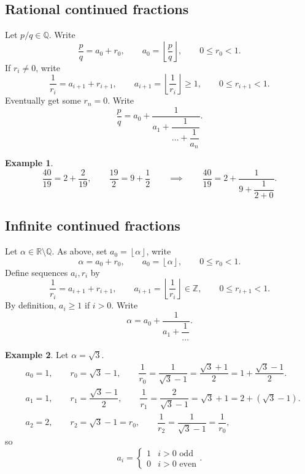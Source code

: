 \documentclass{article}
\newcommand{\Z}{\mathbb{Z}}
\newcommand{\Q}{\mathbb{Q}}
\newcommand{\R}{\mathbb{R}}
\newcommand{\rb}[1]{\left( #1 \right)}
\newcommand{\fb}[1]{\left\lfloor #1 \right\rfloor}
\theoremstyle{definition}\newtheorem{definition}{Definition}
\theoremstyle{definition}\newtheorem{remark}[definition]{Remark}
\theoremstyle{definition}\newtheorem*{example}{Example}
\theoremstyle{definition}\newtheorem*{note}{Note}
\begin{document}
\subsection{Rational continued fractions}

Let $ p / q \in \Q $. Write
$$ \dfrac{p}{q} = a_0 + r_0, \qquad a_0 = \fb{\dfrac{p}{q}}, \qquad 0 \le r_0 < 1. $$
If $ r_i \ne 0 $, write
$$ \dfrac{1}{r_i} = a_{i + 1} + r_{i + 1}, \qquad a_{i + 1} = \fb{\dfrac{1}{r_i}} \ge 1, \qquad 0 \le r_{i + 1} < 1. $$
Eventually get some $ r_n = 0 $. Write
$$ \dfrac{p}{q} = a_0 + \dfrac{1}{a_1 + \dfrac{1}{\dots + \dfrac{1}{a_n}}}. $$

\begin{example}
$$ \dfrac{40}{19} = 2 + \dfrac{2}{19}, \qquad \dfrac{19}{2} = 9 + \dfrac{1}{2} \qquad \implies \qquad \dfrac{40}{19} = 2 + \dfrac{1}{9 + \dfrac{1}{2 + 0}}. $$
\end{example}

\subsection{Infinite continued fractions}

Let $ \alpha \in \R \setminus \Q $. As above, set $ a_0 = \fb{\alpha} $, write
$$ \alpha = a_0 + r_0, \qquad a_0 = \fb{\alpha}, \qquad 0 \le r_0 < 1. $$
Define sequences $ a_i, r_i $ by
$$ \dfrac{1}{r_i} = a_{i + 1} + r_{i + 1}, \qquad a_{i + 1} = \fb{\dfrac{1}{r_i}} \in \Z, \qquad 0 \le r_{i + 1} < 1. $$
By definition, $ a_i \ge 1 $ if $ i > 0 $. Write
$$ \alpha = a_0 + \dfrac{1}{a_1 + \dfrac{1}{\dots}}. $$

\begin{example}
Let $ \alpha = \sqrt{3} $.
\begin{align*}
& a_0 = 1, \qquad r_0 = \sqrt{3} - 1, \qquad \dfrac{1}{r_0} = \dfrac{1}{\sqrt{3} - 1} = \dfrac{\sqrt{3} + 1}{2} = 1 + \dfrac{\sqrt{3} - 1}{2}. \\
& a_1 = 1, \qquad r_1 = \dfrac{\sqrt{3} - 1}{2}, \qquad \dfrac{1}{r_1} = \dfrac{2}{\sqrt{3} - 1} = \sqrt{3} + 1 = 2 + \rb{\sqrt{3} - 1}. \\
& a_2 = 2, \qquad r_2 = \sqrt{3} - 1 = r_0, \qquad \dfrac{1}{r_2} = \dfrac{1}{\sqrt{3} - 1} = \dfrac{1}{r_0},
\end{align*}
so
$$ a_i = \begin{cases}
1 & i > 0 \text{ odd} \\
0 & i > 0 \text{ even}
\end{cases}. $$
\end{example}
\end{document}
